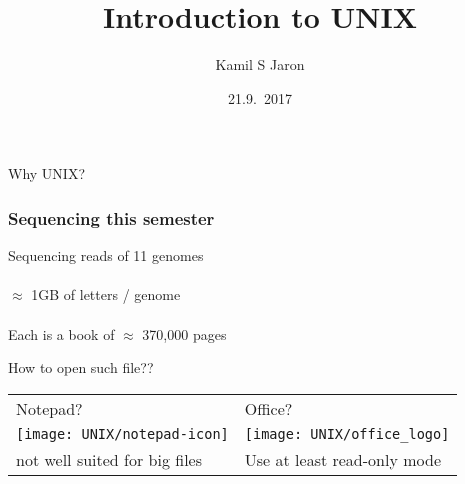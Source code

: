 \documentclass[xcolor=dvipsnames]{beamer}
\title[ ]{Introduction to UNIX}
\author{Kamil S Jaron}
\date{21.9.~2017}
\begin{document}
\Large
\begin{frame}
	\titlepage
\end{frame}


\begin{frame}
	\Huge
	\begin{center}
		Why UNIX?
	\end{center}
\end{frame}

\begin{frame}
	\frametitle{Sequencing this semester}
	\LARGE
	\begin{center}
	Sequencing reads of 11 genomes \\
	~\\
	\pause
	$\approx$ 1GB of letters / genome \\
	~\\
	Each is a book of $\approx$ 370,000 pages
	\end{center}
\end{frame}

\begin{frame}
	\begin{center}
	\huge
	How to open such file?? \\
	\vspace{1cm}

	\Large
	\begin{tabular}{C{0.4\textwidth}C{0.4\textwidth}}
	Notepad? & Office? \\
	\texttt{[image: UNIX/notepad-icon]} & \texttt{[image: UNIX/office\_logo]} \\
	\small not well suited for big files & \small Use at least read-only mode\\
	\end{tabular}
	\end{center}
\end{frame}
\end{document}
